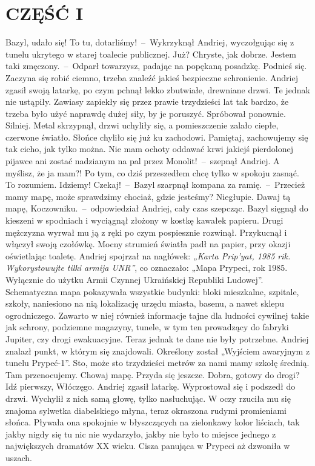 \documentclass[../MAIN.tex]{subfiles}
\begin{document}
\section*{\centering CZĘŚĆ I}
\sd
\xx Bazyl, udało się! To tu, dotarliśmy!~--~Wykrzyknął Andriej, wyczołgując się z tunelu ukrytego w starej toalecie publicznej.
\xx Już? Chryste, jak dobrze. Jestem taki zmęczony.~--~Odparł towarzysz, padając na popękaną posadzkę.
\xx Podnieś się. Zaczyna się robić ciemno, trzeba znaleźć jakieś bezpieczne schronienie.
\qd
Andriej zgasił swoją latarkę, po czym pchnął lekko zbutwiałe, drewniane drzwi. Te jednak nie ustąpiły. Zawiasy zapiekły się przez prawie trzydzieści lat tak bardzo, że trzeba było użyć naprawdę dużej siły, by je poruszyć. Spróbował ponownie. Silniej. Metal skrzypnął, drzwi uchyliły się, a pomieszczenie zalało ciepłe, czerwone światło. Słońce chyliło się już ku zachodowi.
\sx
Pamiętaj, zachowujemy się tak cicho, jak tylko można. Nie mam ochoty oddawać krwi jakiejś pierdolonej pijawce ani zostać nadzianym na pal przez Monolit!~--~szepnął Andriej.
\xx A myślisz, że ja mam?! Po tym, co dziś przeszedłem chcę tylko w spokoju zasnąć.
\xx To rozumiem. Idziemy!
\xx Czekaj!~--~Bazyl szarpnął kompana za ramię.~--~Przecież mamy mapę, może sprawdzimy chociaż, gdzie jesteśmy?
\xx Niegłupie. Dawaj tą mapę, Koczowniku.~--~odpowiedział Andriej, cały czas szepcząc.
\qm
Bazyl sięgnął do kieszeni w spodniach i wyciągnął złożony w kostkę kawałek papieru. Drugi mężczyzna wyrwał mu ją z ręki po czym pospiesznie rozwinął. Przykucnął i włączył swoją czołówkę. Mocny strumień światła padł na papier, przy okazji oświetlając toaletę. Andriej spojrzał na nagłówek: \textit{„Karta Prip’yat, 1985 rik. Wykorystowujte tilki armija UNR”}, co oznaczało: „Mapa Prypeci, rok 1985. Wyłącznie do użytku Armii Czynnej Ukraińskiej Republiki Ludowej”. Schematyczna mapa pokazywała wszystkie budynki: bloki mieszkalne, szpitale, szkoły, naniesiono na nią lokalizację urzędu miasta, basenu, a nawet sklepu ogrodniczego. Zawarto w niej również informacje tajne dla ludności cywilnej takie jak schrony, podziemne magazyny, tunele, w tym ten prowadzący do fabryki Jupiter, czy drogi ewakuacyjne. Teraz jednak te dane nie były potrzebne. Andriej znalazł punkt, w którym się znajdowali. Określony został „Wyjściem awaryjnym z tunelu Prypeć-1”.
\sx
Sto, może sto trzydzieści metrów za nami mamy szkołę średnią. Tam przenocujemy. Chowaj mapę. Przyda się jeszcze.
\xx Dobra, gotowy do drogi? Idź pierwszy, Włóczęgo.
\qd
Andriej zgasił latarkę. Wyprostował się i podszedł do drzwi. Wychylił z nich samą głowę, tylko nasłuchując. W oczy rzuciła mu się znajoma sylwetka diabelskiego młyna, teraz okraszona rudymi promieniami słońca. Pływała ona spokojnie w błyszczących na zielonkawy kolor liściach, tak jakby nigdy się tu nic nie wydarzyło, jakby nie było to miejsce jednego z największych dramatów XX wieku. Cisza panująca w Prypeci aż dzwoniła w uszach.
\end{document}
